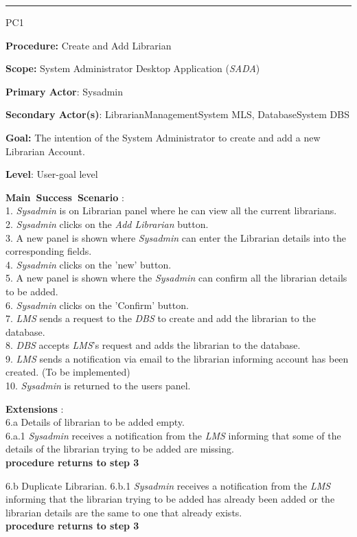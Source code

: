 
\vspace{0.5cm}
\hrule
\begin{lyxlist}{PC1}
\small{
\item [\textbf{Procedure:}] Create and Add Librarian
\item [\textbf{Scope:}] System Administrator Desktop Application (\emph{SADA})
\item [\textbf{Primary Actor}:] Sysadmin
\item [\textbf{Secondary Actor(s)}:] LibrarianManagementSystem MLS,
DatabaseSystem DBS
\item [\textbf{Goal:}] The intention of the System Administrator to create and
add a new Librarian Account.
\item [\textbf{Level}:] User-goal level
\item [\textbf{Main~Success~Scenario}]:\\
1. \emph{Sysadmin} is on Librarian panel where he can view all the current
librarians.
\\
2. \emph{Sysadmin} clicks on the \emph{Add Librarian} button. \\
3. A new panel is shown where \emph{Sysadmin} can enter the Librarian details
into the corresponding fields.
\\
4. \emph{Sysadmin} clicks on the 'new' button. \\
5. A new panel is shown where the \emph{Sysadmin} can confirm all the librarian
details to be added.\\
6. \emph{Sysadmin} clicks on the 'Confirm' button. \\
7. \emph{LMS} sends a request to the \emph{DBS} to create and add the librarian
to the database.
\\
8. \emph{DBS} accepts \emph{LMS}'s request and adds the librarian to the
database. \\
9. \emph{LMS} sends a notification via email to the librarian
informing account has been created. (To be implemented)
\\
10. \emph{Sysadmin} is returned to the users panel. \\



\item [\textbf{Extensions}]: \\
6.a Details of librarian to be added empty.\\
\hspace*{0.5cm} 6.a.1 \emph{Sysadmin} receives a notification from
the \emph{LMS} informing that some of the details of the librarian trying to be
added are missing. \\
\hspace*{0.5cm} \textbf{procedure returns to step 3}

6.b Duplicate Librarian.
\hspace*{0.5cm} 6.b.1 \emph{Sysadmin} receives a notification from
the \emph{LMS} informing that the librarian trying to be added has already been
added or the librarian details are the same to one that already exists.\\
\hspace*{0.5cm} \textbf{procedure returns to step 3}}

\end{lyxlist}
